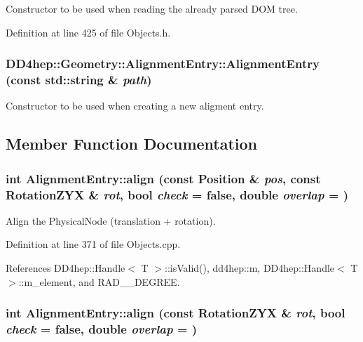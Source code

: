 Constructor to be used when reading the already parsed DOM tree. 

Definition at line 425 of file Objects.h.\hypertarget{class_d_d4hep_1_1_geometry_1_1_alignment_entry_a877bdea72e8ea9944d688a3d8f0c2c63}{
\subsubsection[{AlignmentEntry}]{\setlength{\rightskip}{0pt plus 5cm}DD4hep::Geometry::AlignmentEntry::AlignmentEntry (const std::string \& {\em path})}}
\label{class_d_d4hep_1_1_geometry_1_1_alignment_entry_a877bdea72e8ea9944d688a3d8f0c2c63}


Constructor to be used when creating a new aligment entry. 

\subsection{Member Function Documentation}
\hypertarget{class_d_d4hep_1_1_geometry_1_1_alignment_entry_ad66e1d47dd542160eea927f23b76018a}{
\subsubsection[{align}]{\setlength{\rightskip}{0pt plus 5cm}int AlignmentEntry::align (const {\bf Position} \& {\em pos}, \/  const {\bf RotationZYX} \& {\em rot}, \/  bool {\em check} = {\ttfamily false}, \/  double {\em overlap} = {})}}
\label{class_d_d4hep_1_1_geometry_1_1_alignment_entry_ad66e1d47dd542160eea927f23b76018a}


Align the PhysicalNode (translation + rotation). 

Definition at line 371 of file Objects.cpp.

References DD4hep::Handle$<$ T $>$::isValid(), dd4hep::m, DD4hep::Handle$<$ T $>$::m\_\-element, and RAD\_\_\-DEGREE.\hypertarget{class_d_d4hep_1_1_geometry_1_1_alignment_entry_af2e1c4e25b729271106064e912de2645}{
\subsubsection[{align}]{\setlength{\rightskip}{0pt plus 5cm}int AlignmentEntry::align (const {\bf RotationZYX} \& {\em rot}, \/  bool {\em check} = {\ttfamily false}, \/  double {\em overlap} = {})}}
\label{class_d_d4hep_1_1_geometry_1_1_alignment_entry_af2e1c4e25b729271106064e912de2645}


